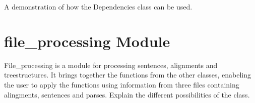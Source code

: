 \documentclass[letterpaper,10pt,english]{sphinxmanual}
\begin{document}

\begin{fulllineitems}
\label{dependencies:dependencies.demo}
A demonstration of how the Dependencies class can be used.

\end{fulllineitems}



\chapter{file\_processing Module}
\label{file_processing:file-processing-module}\label{file_processing::doc}\label{file_processing:module-file_processing}
File\_processing is a module for processing sentences, alignments and treestructures.
It brings together the functions from the other classes, enabeling the user to apply the functions
using information from three files containing alingments, sentences and parses.
Explain the different possibilities of the class.
\end{document}
